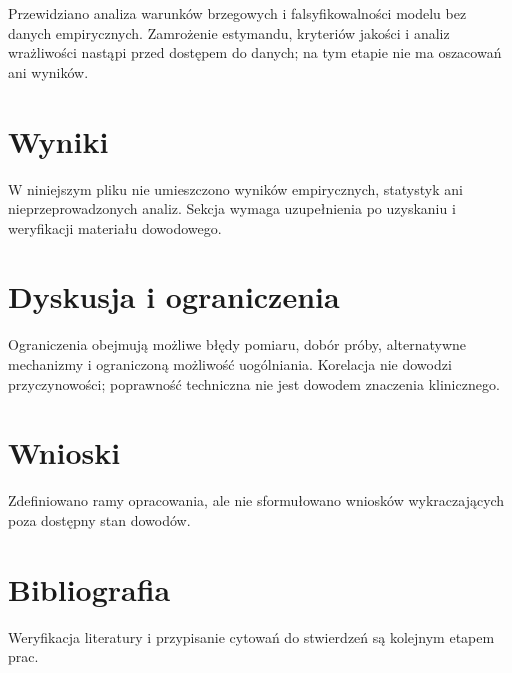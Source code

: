 \documentclass[11pt,a4paper]{article}
\begin{document}
Przewidziano analiza warunków brzegowych i falsyfikowalności modelu bez danych empirycznych. Zamrożenie estymandu, kryteriów jakości i analiz wrażliwości nastąpi przed dostępem do danych; na tym etapie nie ma oszacowań ani wyników.

\section{Wyniki}

W niniejszym pliku nie umieszczono wyników empirycznych, statystyk ani nieprzeprowadzonych analiz. Sekcja wymaga uzupełnienia po uzyskaniu i weryfikacji materiału dowodowego.

\section{Dyskusja i ograniczenia}

Ograniczenia obejmują możliwe błędy pomiaru, dobór próby, alternatywne mechanizmy i ograniczoną możliwość uogólniania. Korelacja nie dowodzi przyczynowości; poprawność techniczna nie jest dowodem znaczenia klinicznego.

\section{Wnioski}

Zdefiniowano ramy opracowania, ale nie sformułowano wniosków wykraczających poza dostępny stan dowodów.

\section*{Bibliografia}

Weryfikacja literatury i przypisanie cytowań do stwierdzeń są kolejnym etapem prac.
\end{document}
